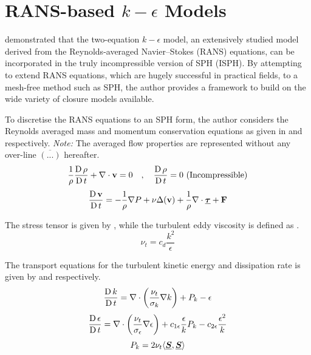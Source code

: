 \section[RANS-based k-epsilon Models]{RANS-based $k-\epsilon$ Models}
\label{sec:rans-based-k-epsilon-model}

\cite{Shao2006} demonstrated that the two-equation $k-\epsilon$ model, an extensively studied model derived from the Reynolds-averaged Navier–Stokes (RANS) equations, can be incorporated in the truly incompressible version of SPH (ISPH). By attempting to extend RANS equations, which are hugely successful in practical fields, to a mesh-free method such as SPH, the author provides a framework to build on the wide variety of closure models available.

To discretise the RANS equations to an SPH form, the author considers the Reynolds averaged mass and momentum conservation equations as given in  and  respectively. \textit{Note:} The averaged flow properties are represented without any over-line $\overline{(...)}$ hereafter.
\begin{equation}
    \frac{1}{\rho} \frac{\operatorname{D} \rho}{\operatorname{D} t} + \nabla \cdot \mathbf{v} = 0 \quad , \quad \frac{\operatorname{D} \rho}{\operatorname{D} t} = 0 \text{ (Incompressible)}
    \label{eq:Shao2006-rans-continuity-governing}
\end{equation}
\begin{equation}
    \frac{\operatorname{D} \mathbf{v}}{\operatorname{D} t} = -\frac{1}{\rho}\nabla P + \nu \Delta( \mathbf{v} ) + \frac{1}{\rho} \nabla \cdot \underline{\bm{\tau}} + \mathbf{F}
    \label{eq:Shao2006-rans-mom-governing}
\end{equation}

The stress tensor is given by , while the turbulent eddy viscosity is defined as .
\begin{equation}
    \nu_t = c_d \frac{k^2}{\epsilon}
    \label{eq:Shao2006-turbulent-eddy-visc}
\end{equation}

The transport equations for the turbulent kinetic energy and dissipation rate is given by  and  respectively.
\begin{equation}
    \frac{\operatorname{D} k}{\operatorname{D} t} = \nabla \cdot \bigg( \frac{\nu_t}{\sigma_k} \nabla k \bigg) + P_k - \epsilon
    \label{eq:Shao2006-k-transport-eq}
\end{equation}
\begin{equation}
    \frac{\operatorname{D} \epsilon}{\operatorname{D} t} = \nabla \cdot \bigg( \frac{\nu_t}{\sigma_{\epsilon}} \nabla \epsilon \bigg) + c_{1\epsilon} \frac{\epsilon}{k} P_k - c_{2\epsilon} \frac{\epsilon^2}{k}
    \label{eq:Shao2006-eps-transport-eq}
\end{equation}
\begin{equation}
    P_k = 2\nu_t \langle \underline{\bm{S}}, \underline{\bm{S}} \rangle
    \label{eq:Shao2006-k-production-term}
\end{equation}

